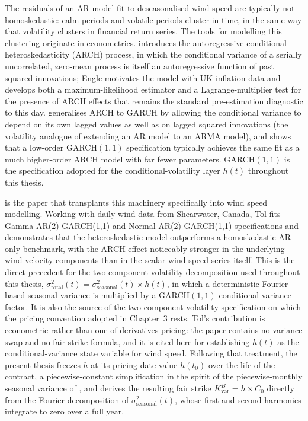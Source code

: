 ﻿\documentclass[11pt, a4paper, twoside]{article}
\begin{document}
The residuals of an AR model fit to deseasonalised wind speed are typically not homoskedastic: calm periods and volatile periods cluster in time, in the same way that volatility clusters in financial return series. The tools for modelling this clustering originate in econometrics. \citet{Engle1982} introduces the autoregressive conditional heteroskedasticity (ARCH) process, in which the conditional variance of a serially uncorrelated, zero-mean process is itself an autoregressive function of past squared innovations; Engle motivates the model with UK inflation data and develops both a maximum-likelihood estimator and a Lagrange-multiplier test for the presence of ARCH effects that remains the standard pre-estimation diagnostic to this day. \citet{Bollerslev1986} generalises ARCH to GARCH by allowing the conditional variance to depend on its own lagged values as well as on lagged squared innovations (the volatility analogue of extending an AR model to an ARMA model), and shows that a low-order GARCH$(1,1)$ specification typically achieves the same fit as a much higher-order ARCH model with far fewer parameters. GARCH$(1,1)$ is the specification adopted for the conditional-volatility layer $h(t)$ throughout this thesis.

\citet{Tol1997} is the paper that transplants this machinery specifically into wind speed modelling. Working with daily wind data from Shearwater, Canada, Tol fits Gamma-AR(2)-GARCH(1,1) and Normal-AR(2)-GARCH(1,1) specifications and demonstrates that the heteroskedastic model outperforms a homoskedastic AR-only benchmark, with the ARCH effect noticeably stronger in the underlying wind velocity components than in the scalar wind speed series itself. This is the direct precedent for the two-component volatility decomposition used throughout this thesis, $\sigma^2_{\text{total}}(t) = \sigma^2_{\text{seasonal}}(t) \times h(t)$, in which a deterministic Fourier-based seasonal variance is multiplied by a GARCH$(1,1)$ conditional-variance factor. It is also the source of the two-component volatility specification on which the pricing convention adopted in Chapter~3 rests. Tol's contribution is econometric rather than one of derivatives pricing: the paper contains no variance swap and no fair-strike formula, and it is cited here for establishing $h(t)$ as the conditional-variance state variable for wind speed. Following that treatment, the present thesis freezes $h$ at its pricing-date value $h(t_0)$ over the life of the contract, a piecewise-constant simplification in the spirit of the piecewise-monthly seasonal variance of \citet{AlatonEtAl2002}, and derives the resulting fair strike $K_{\text{var}}^B = h \times C_0$ directly from the Fourier decomposition of $\sigma^2_{\text{seasonal}}(t)$, whose first and second harmonics integrate to zero over a full year.
\end{document}
